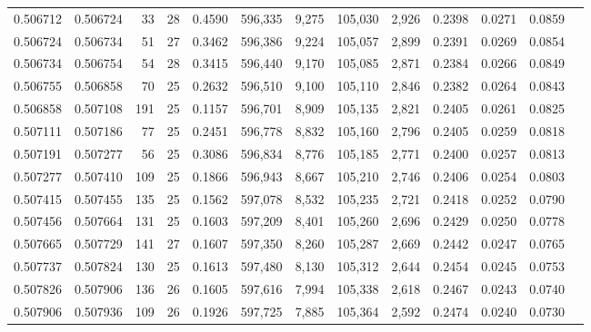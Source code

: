 \begin{tabular}{rrrrrrrrrrrrr}
0.506712 & 0.506724 &  33 &  28 &                                     0.4590 & 596,335 &   9,275 & 105,030 &   2,926 & 0.2398 & 0.0271 & 0.0859 \\
0.506724 & 0.506734 &  51 &  27 &                                     0.3462 & 596,386 &   9,224 & 105,057 &   2,899 & 0.2391 & 0.0269 & 0.0854 \\
0.506734 & 0.506754 &  54 &  28 &                                     0.3415 & 596,440 &   9,170 & 105,085 &   2,871 & 0.2384 & 0.0266 & 0.0849 \\
0.506755 & 0.506858 &  70 &  25 &                                     0.2632 & 596,510 &   9,100 & 105,110 &   2,846 & 0.2382 & 0.0264 & 0.0843 \\
0.506858 & 0.507108 & 191 &  25 &                                     0.1157 & 596,701 &   8,909 & 105,135 &   2,821 & 0.2405 & 0.0261 & 0.0825 \\
0.507111 & 0.507186 &  77 &  25 &                                     0.2451 & 596,778 &   8,832 & 105,160 &   2,796 & 0.2405 & 0.0259 & 0.0818 \\
0.507191 & 0.507277 &  56 &  25 &                                     0.3086 & 596,834 &   8,776 & 105,185 &   2,771 & 0.2400 & 0.0257 & 0.0813 \\
0.507277 & 0.507410 & 109 &  25 &                                     0.1866 & 596,943 &   8,667 & 105,210 &   2,746 & 0.2406 & 0.0254 & 0.0803 \\
0.507415 & 0.507455 & 135 &  25 &                                     0.1562 & 597,078 &   8,532 & 105,235 &   2,721 & 0.2418 & 0.0252 & 0.0790 \\
0.507456 & 0.507664 & 131 &  25 &                                     0.1603 & 597,209 &   8,401 & 105,260 &   2,696 & 0.2429 & 0.0250 & 0.0778 \\
0.507665 & 0.507729 & 141 &  27 &                                     0.1607 & 597,350 &   8,260 & 105,287 &   2,669 & 0.2442 & 0.0247 & 0.0765 \\
0.507737 & 0.507824 & 130 &  25 &                                     0.1613 & 597,480 &   8,130 & 105,312 &   2,644 & 0.2454 & 0.0245 & 0.0753 \\
0.507826 & 0.507906 & 136 &  26 &                                     0.1605 & 597,616 &   7,994 & 105,338 &   2,618 & 0.2467 & 0.0243 & 0.0740 \\
0.507906 & 0.507936 & 109 &  26 &                                     0.1926 & 597,725 &   7,885 & 105,364 &   2,592 & 0.2474 & 0.0240 & 0.0730 \\

\end{tabular}
